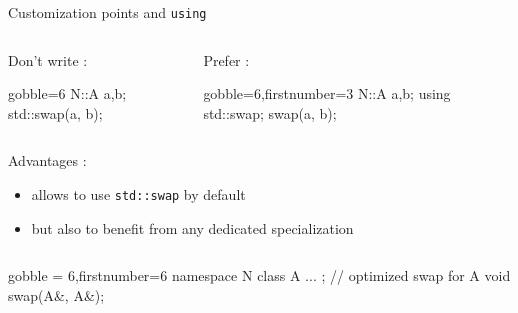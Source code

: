 \begin{frame}[fragile]
  \begin{block}{Customization points and \texttt{using}}
    \begin{columns}[t]
      \begin{column}{.35\textwidth}
        Don't write :
        \begin{cppcode*}{gobble=6}
          N::A a,b;
          std::swap(a, b);
        \end{cppcode*}
      \end{column}
      \begin{column}{.35\textwidth}
        Prefer :
        \begin{cppcode*}{gobble=6,firstnumber=3}
          N::A a,b;
          using std::swap;
          swap(a, b);
        \end{cppcode*}
      \end{column}
    \end{columns}
    \vspace{.2cm}
    Advantages :
    \begin{itemize}
    \item allows to use \texttt{std::swap} by default
    \item but also to benefit from any dedicated specialization
    \end{itemize}
    \begin{columns}
      \begin{column}{.7\textwidth}
        \begin{cppcode*}{gobble = 6,firstnumber=6}
          namespace N {
            class A { ... };
            // optimized swap for A
            void swap(A&, A&);
          }
        \end{cppcode*}
      \end{column}
    \end{columns}
  \end{block}
\end{frame}

